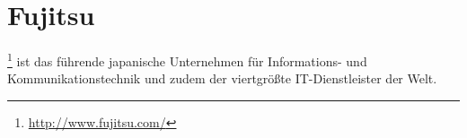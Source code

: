 \section{Fujitsu}
\label{sec_fujitsu}

%

\footnote{\url{http://www.fujitsu.com/}} ist das führende japanische Unternehmen für Informations- und Kommunikationstechnik und zudem der viertgrößte IT-Dienstleister der Welt. 

